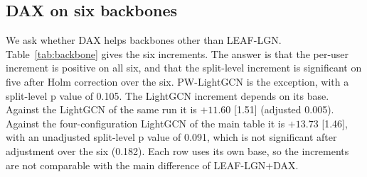 \documentclass[preprint,12pt,authoryear]{elsarticle}
\begin{document}
\subsection{DAX on six backbones}
\label{sec:res-backbone}

We ask whether DAX helps backbones other than LEAF-LGN. Table~\ref{tab:backbone} gives the six increments. The answer is that the per-user increment is positive on all six, and that the split-level
increment is significant on five after Holm correction over the six. PW-LightGCN is the exception, with a split-level p value of 0.105. The LightGCN
increment depends on its base. Against the LightGCN of the same run it is $+11.60$ [1.51] (adjusted 0.005). Against the four-configuration LightGCN of the
main table it is $+13.73$ [1.46], with an unadjusted split-level p value of 0.091, which is not significant after adjustment over the six (0.182). Each
row uses its own base, so the increments are not comparable with the main difference of LEAF-LGN+DAX.
\end{document}
